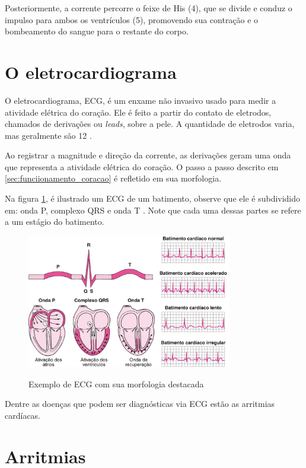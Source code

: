 Posteriormente, a corrente percorre o feixe de His (4), que se divide e conduz o impulso para ambos os ventrículos (5), promovendo sua contração e o bombeamento do sangue para o restante do corpo.

\section{O eletrocardiograma}
\label{sec:ecg}

O eletrocardiograma, ECG, é um enxame não invasivo usado para medir a atividade elétrica do coração. Ele é feito a partir do contato de eletrodos, chamados de derivações ou \textit{leads}, sobre a pele.
A quantidade de eletrodos varia, mas geralmente são 12 \cite{msd_ecg}.

Ao registrar a magnitude e direção da corrente, as derivações geram uma onda que representa a atividade elétrica do coração. O passo a passo descrito em \ref{sec:funciionamento_coracao} é refletido em sua morfologia.

Na figura \ref{fig:ecg_exemplo_coracao}, é ilustrado um  ECG de um batimento, observe que ele é subdividido em: onda P, complexo QRS e onda T \cite{msd_ecg}. Note que cada uma dessas partes se refere a um estágio do batimento.

\begin{figure}[H]
  \centering
  \caption{Exemplo de ECG com sua morfologia destacada}
   \includegraphics[width=0.8\textwidth]{figuras/ecg_exemplo_coracao.png} %
  \label{fig:ecg_exemplo_coracao}
\end{figure}

Dentre as doenças que podem ser diagnósticas via ECG estão as arritmias cardíacas. 

\section{Arritmias}


